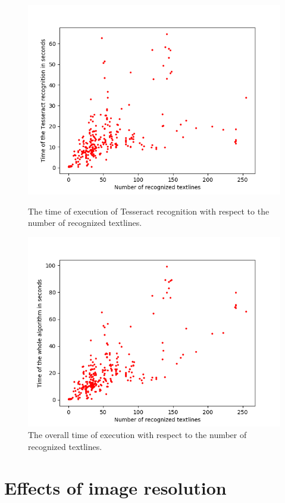 \begin{figure}[t]
    \includegraphics[width=\linewidth]{img/results/textlinesTimeTesseract.png}
    \caption{The time of execution of Tesseract recognition with respect to the number of recognized textlines.}
    \label{fig:textlinesTimeTess}
\endminipage\hfill
{}
    \includegraphics[width=\linewidth]{img/results/textlinesTimeAll.png}
    \caption{The overall time of execution with respect to the number of recognized textlines.}
    \label{fig:textlinesTime}
\endminipage
\label{resultsTextEffects}
\end{figure}

\section{Effects of image resolution}

